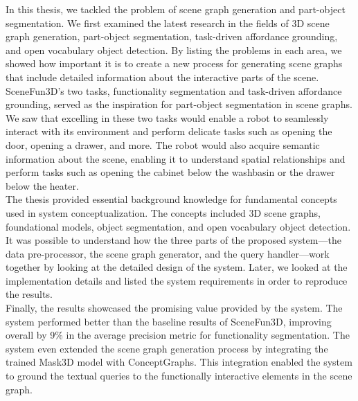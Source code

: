In this thesis, we tackled the problem of scene graph generation and part-object segmentation.
 We first examined the latest research in the fields of 3D scene graph generation, part-object segmentation, 
 task-driven affordance grounding, and open vocabulary object detection. By listing the problems in each area, 
 we showed how important it is to create a new process for generating scene graphs that include detailed information 
 about the interactive parts of the scene. \\ SceneFun3D's two tasks, functionality segmentation and task-driven affordance grounding, 
 served as the inspiration for part-object segmentation in scene graphs. We saw that excelling in these two tasks would enable a
  robot to seamlessly interact with its environment and perform delicate tasks such as opening the door, opening a drawer, and more.
   The robot would also acquire semantic information about the scene, enabling it to understand spatial relationships and perform 
   tasks such as opening the cabinet below the washbasin or the drawer below the heater. \\The thesis provided essential background
    knowledge for fundamental concepts used in system conceptualization. The concepts included 3D scene graphs, foundational models, 
    object segmentation, and open vocabulary object detection. \\ It was possible to understand how the three parts of the proposed 
    system—the data pre-processor, the scene graph generator, and the query handler—work together by looking at the detailed design of 
    the system. Later, we looked at the implementation details and listed the system requirements in order to reproduce the results. \\ 
    Finally, the results showcased the promising value provided by the system. The system performed better than the baseline results of SceneFun3D,
     improving overall by 9\% in the average precision metric for functionality segmentation. 
     The system even extended the scene graph generation process by integrating the trained Mask3D model with ConceptGraphs.
      This integration enabled the system to ground the textual queries to the functionally interactive elements in the scene graph.


